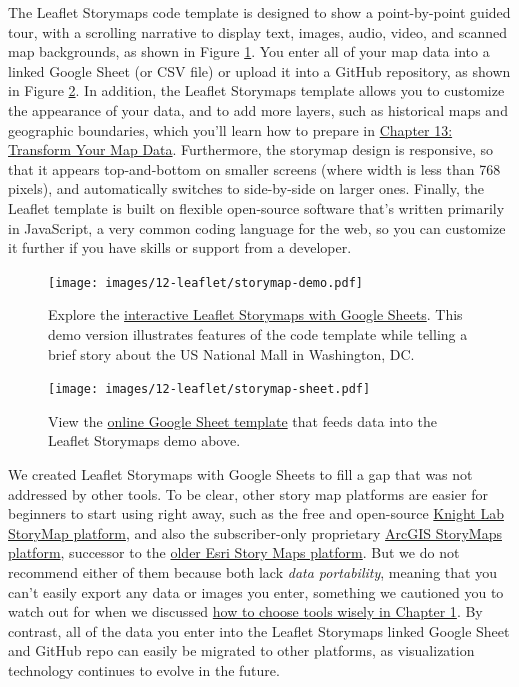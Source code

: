 \documentclass[
  english,
]{book}
\begin{document}
The Leaflet Storymaps code template is designed to show a point-by-point guided tour, with a scrolling narrative to display text, images, audio, video, and scanned map backgrounds, as shown in Figure \ref{fig:storymap-demo}. You enter all of your map data into a linked Google Sheet (or CSV file) or upload it into a GitHub repository, as shown in Figure \ref{fig:storymap-sheet}. In addition, the Leaflet Storymaps template allows you to customize the appearance of your data, and to add more layers, such as historical maps and geographic boundaries, which you'll learn how to prepare in \href{transform.html}{Chapter 13: Transform Your Map Data}. Furthermore, the storymap design is responsive, so that it appears top-and-bottom on smaller screens (where width is less than 768 pixels), and automatically switches to side-by-side on larger ones. Finally, the Leaflet template is built on flexible open-source software that's written primarily in JavaScript, a very common coding language for the web, so you can customize it further if you have skills or support from a developer.



\begin{figure}
\centering
\texttt{[image: images/12-leaflet/storymap-demo.pdf]}
\caption{\label{fig:storymap-demo}Explore the \href{https://handsondataviz.github.io/leaflet-storymaps-with-google-sheets/}{interactive Leaflet Storymaps with Google Sheets}. This demo version illustrates features of the code template while telling a brief story about the US National Mall in Washington, DC.}
\end{figure}



\begin{figure}
\centering
\texttt{[image: images/12-leaflet/storymap-sheet.pdf]}
\caption{\label{fig:storymap-sheet}View the \href{https://docs.google.com/spreadsheets/d/1AO6XHL_0JafWZF4KEejkdDNqfuZWUk3SlNlQ6MjlRFM/}{online Google Sheet template} that feeds data into the Leaflet Storymaps demo above.}
\end{figure}

We created Leaflet Storymaps with Google Sheets to fill a gap that was not addressed by other tools. To be clear, other story map platforms are easier for beginners to start using right away, such as the free and open-source \href{https://storymap.knightlab.com/}{Knight Lab StoryMap platform}, and also the subscriber-only proprietary \href{https://storymaps.arcgis.com}{ArcGIS StoryMaps platform}, successor to the \href{https://storymaps-classic.arcgis.com/}{older Esri Story Maps platform}. But we do not recommend either of them because both lack \emph{data portability}, meaning that you can't easily export any data or images you enter, something we cautioned you to watch out for when we discussed \href{choose.html}{how to choose tools wisely in Chapter 1}. By contrast, all of the data you enter into the Leaflet Storymaps linked Google Sheet and GitHub repo can easily be migrated to other platforms, as visualization technology continues to evolve in the future.
\end{document}
